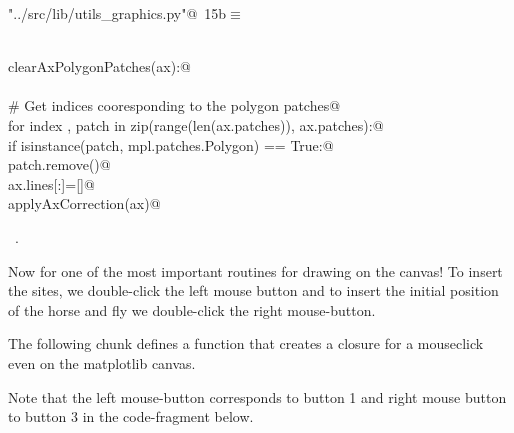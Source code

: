 \documentclass[11.5pt]{report}
\begin{document}
\begin{flushleft} \small\label{scrap6}\raggedright\small
{} \verb@"../src/lib/utils_graphics.py"@\nobreak\ {\footnotesize {15b}}$\equiv$
\vspace{-1ex}
\begin{list}{}{} \item
\mbox{}\verb@@\\
\mbox{}\verb@def clearAxPolygonPatches(ax):@\\
\mbox{}\verb@@\\
\mbox{}\verb@    # Get indices cooresponding to the polygon patches@\\
\mbox{}\verb@    for index , patch in zip(range(len(ax.patches)), ax.patches):@\\
\mbox{}\verb@        if isinstance(patch, mpl.patches.Polygon) == True:@\\
\mbox{}\verb@            patch.remove()@\\
\mbox{}\verb@    ax.lines[:]=[]@\\
\mbox{}\verb@    applyAxCorrection(ax)@\\
\mbox{}\verb@@{\NWsep}
\end{list}
\vspace{-1.5ex}
\footnotesize
\begin{list}{}{\setlength{\itemsep}{-\parsep}\setlength{\itemindent}{-\leftmargin}}
\item \NWtxtFileDefBy\ .

\item{}
\end{list}
\vspace{4ex}
\end{flushleft}
\newchunk Now for one of the most important routines for drawing on the canvas! 
To insert the sites, we double-click the left mouse button and to insert the 
initial position of the horse and fly we double-click the right mouse-button. 

The following chunk defines a function that creates a closure for a mouseclick 
even on the matplotlib canvas. 

Note that the left mouse-button corresponds to button 1 and right mouse button
to button 3 in the code-fragment below. 

\end{document}
